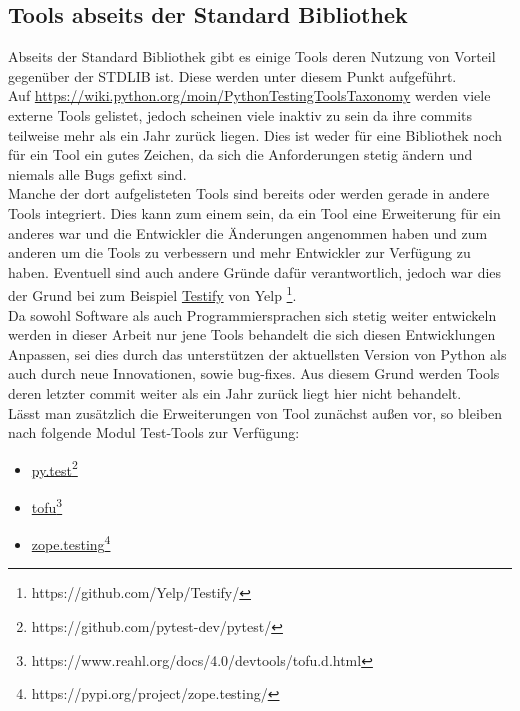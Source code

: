 \subsection{Tools abseits der Standard Bibliothek}\label{python-tools:extlib}
Abseits der Standard Bibliothek gibt es einige Tools deren Nutzung von
Vorteil gegenüber der STDLIB ist. Diese werden unter diesem Punkt aufgeführt.
\newline
\\
Auf \url{https://wiki.python.org/moin/PythonTestingToolsTaxonomy} werden viele
externe Tools gelistet, jedoch scheinen viele inaktiv zu sein da ihre \glspl{commit}
teilweise mehr als ein Jahr zurück liegen. Dies ist weder für eine Bibliothek noch
für ein Tool ein gutes Zeichen, da sich die Anforderungen stetig ändern und niemals
alle Bugs gefixt sind.
\newline
\\
Manche der dort aufgelisteten Tools sind bereits oder werden gerade in andere Tools
integriert. Dies kann zum einem sein, da ein Tool eine Erweiterung für ein anderes
war und die Entwickler die Änderungen angenommen haben und zum anderen um die Tools
zu verbessern und mehr Entwickler zur Verfügung zu haben. Eventuell sind auch
andere Gründe dafür verantwortlich, jedoch war dies der Grund bei zum Beispiel
\href{https://github.com/Yelp/Testify/}{Testify}
von Yelp \footnote{https://github.com/Yelp/Testify/}.
\newline
\\
Da sowohl Software als auch Programmiersprachen sich stetig weiter entwickeln werden in
dieser Arbeit nur jene Tools behandelt die sich diesen Entwicklungen Anpassen, sei dies
durch das unterstützen der aktuellsten Version von Python als auch durch neue Innovationen,
sowie \Gls{bug}-fixes. Aus diesem Grund werden Tools deren letzter \Gls{commit} weiter
als ein Jahr zurück liegt hier nicht behandelt.
\newline
\\
Lässt man zusätzlich die Erweiterungen von Tool zunächst außen vor, so bleiben nach
\cite{wiki.python:PythonTestingToolsTaxonomy} folgende Modul Test-Tools zur Verfügung:
\begin{itemize}
    \item \href{https://github.com/pytest-dev/pytest/}{py.test}\footnote{https://github.com/pytest-dev/pytest/}
    \item \href{https://www.reahl.org/docs/4.0/devtools/tofu.d.html}{tofu}\footnote{https://www.reahl.org/docs/4.0/devtools/tofu.d.html}
    \item \href{https://pypi.org/project/zope.testing/}{zope.testing}\footnote{https://pypi.org/project/zope.testing/}
\end{itemize}
